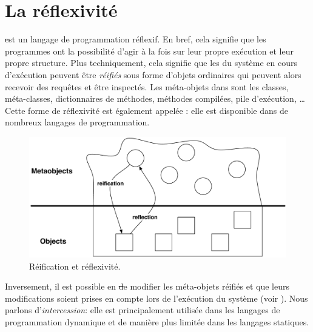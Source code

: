 \documentclass[a4paper,10pt,twoside]{book}
\begin{document}
	\sloppy
\fi

\chapter{La réflexivité}


\st est un langage de programmation réflexif. En bref, cela signifie que les programmes ont la possibilité d'agir à la fois sur leur propre exécution et leur propre structure.
Plus techniquement, cela signifie que les  du système en cours d'exécution peuvent être \emph{réifiés} sous forme d'objets ordinaires qui peuvent alors recevoir des requêtes et être inspectés.
Les méta-objets dans \st sont les classes, méta-classes, dictionnaires de méthodes, méthodes compilées, pile d'exécution, \etc\ldots
Cette forme de réflexivité est également appelée : elle est disponible dans de nombreux langages de programmation.

\begin{figure}[ht]\centering
	\includegraphics[width=\linewidth]{reflect}
	\caption{Réification et réflexivité.} %
\end{figure}
Inversement, il est possible en \st de modifier les méta-objets réifiés et que leurs modifications soient prises en compte lors de l'exécution du système (voir ).
Nous parlons d'\emph{intercession}: elle est principalement utilisée dans les langages de programmation dynamique et de manière plus limitée dans les langages statiques.
\end{document}

